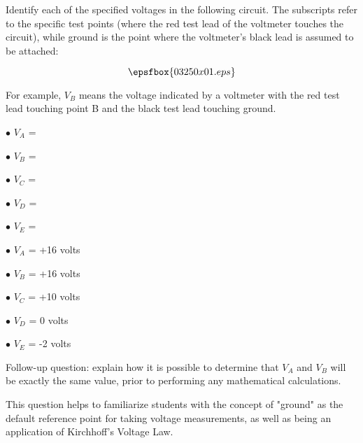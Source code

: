 

Identify each of the specified voltages in the following circuit.  The subscripts refer to the specific test points (where the red test lead of the voltmeter touches the circuit), while ground is the point where the voltmeter's black lead is assumed to be attached:

$$\epsfbox{03250x01.eps}$$

For example, $V_B$ means the voltage indicated by a voltmeter with the red test lead touching point B and the black test lead touching ground.

\medskip
\item{$\bullet$} $V_A$ = 
\item{$\bullet$} $V_B$ = 
\item{$\bullet$} $V_C$ = 
\item{$\bullet$} $V_D$ =
\item{$\bullet$} $V_E$ = 
\medskip







\medskip
\item{$\bullet$} $V_A$ = +16 volts
\item{$\bullet$} $V_B$ = +16 volts
\item{$\bullet$} $V_C$ = +10 volts
\item{$\bullet$} $V_D$ = 0 volts
\item{$\bullet$} $V_E$ = -2 volts
\medskip

\vskip 10pt

Follow-up question: explain how it is possible to determine that $V_A$ and $V_B$ will be exactly the same value, prior to performing any mathematical calculations.







This question helps to familiarize students with the concept of "ground" as the default reference point for taking voltage measurements, as well as being an application of Kirchhoff's Voltage Law.




